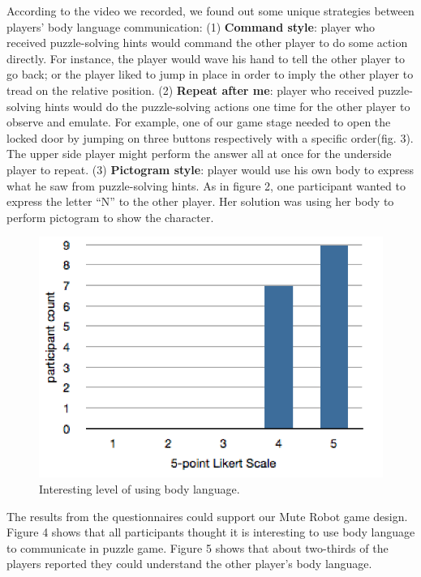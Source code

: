 \documentclass{chi-ext}
\begin{document}
According to the video we recorded, we found out some unique strategies between players' body language communication: 
(1) {\bf Command style}: player who received puzzle-solving hints would command the other player to do some action directly. For instance, the player would wave his hand to tell the other player to go back; or the player liked to jump in place in order to imply the other player to tread on the relative position.
(2) {\bf Repeat after me}: player who received puzzle-solving hints would do the puzzle-solving actions one time for the other player to observe and emulate. For example, one of our game stage needed to open the locked door by jumping on three buttons respectively with a specific order(fig. 3). The upper side player might perform the answer all at once for the underside player to repeat.
(3) {\bf Pictogram style}: player would use his own body to express what he saw from puzzle-solving hints. As in figure 2, one participant wanted to express the letter ``N'' to the other player. Her solution was using her body to perform pictogram to show the character.


\begin{figure}
  \centering
  \includegraphics[width=0.8\linewidth]{figures/1_BLisInteresting.png}
  \caption{Interesting level of using body language.}
  \label{fig:1_BLisInteresting}
\end{figure}

The results from the questionnaires could support our Mute Robot game design. 
Figure 4 shows that all participants thought it is interesting to use body language to communicate in puzzle game.
Figure 5 shows that about two-thirds of the players reported they could understand the other player's body language.
\end{document}
